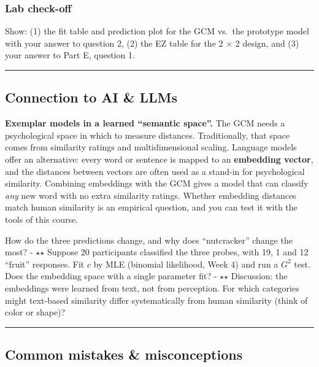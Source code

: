 \subsubsection{Lab check-off}

Show: (1) the fit table and prediction plot for the GCM vs.~the
prototype model with your answer to question 2, (2) the EZ table for the
2 × 2 design, and (3) your answer to Part E, question 1.

\begin{center}\rule{0.5\linewidth}{0.5pt}\end{center}

\subsection{Connection to AI \& LLMs}

\textbf{Exemplar models in a learned ``semantic space''.} The GCM needs
a psychological space in which to measure distances. Traditionally, that
space comes from similarity ratings and multidimensional scaling.
Language models offer an alternative: every word or sentence is mapped
to an \textbf{embedding vector}, and the distances between vectors are
often used as a stand-in for psychological similarity. Combining
embeddings with the GCM gives a model that can classify \emph{any} new
word with no extra similarity ratings. Whether embedding distances match
human similarity is an empirical question, and you can test it with the
tools of this course.

How do the three predictions change, and why does ``nutcracker'' change
the most? - \ensuremath{\star}\ensuremath{\star} Suppose 20 participants classified the three probes, with
19, 1 and 12 ``fruit'' responses. Fit \(c\) by MLE (binomial likelihood,
Week 4) and run a \(G^2\) test. Does the embedding space with a single
parameter fit? - \ensuremath{\star}\ensuremath{\star} Discussion: the embeddings were learned from text,
not from perception. For which categories might text-based similarity
differ systematically from human similarity (think of color or shape)?

\begin{center}\rule{0.5\linewidth}{0.5pt}\end{center}

\subsection{Common mistakes \& misconceptions}

